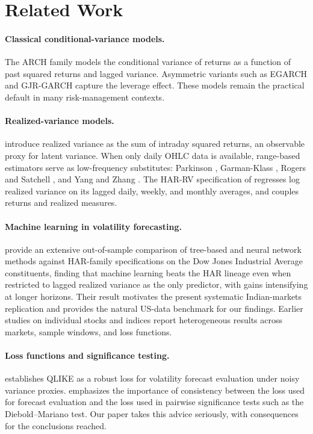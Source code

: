 \documentclass[11pt]{article}
\begin{document}
\section{Related Work}
\label{sec:related}

\paragraph{Classical conditional-variance models.} The ARCH family
\citep{engle1982arch, bollerslev1986garch} models the conditional
variance of returns as a function of past squared returns and lagged
variance. Asymmetric variants such as EGARCH \citep{nelson1991egarch}
and GJR-GARCH \citep{glosten1993relation} capture the leverage
effect. These models remain the practical default in many
risk-management contexts.

\paragraph{Realized-variance models.} \citet{andersen2003modeling}
introduce realized variance as the sum of intraday squared returns,
an observable proxy for latent variance. When only daily OHLC data
is available, range-based estimators serve as low-frequency
substitutes: Parkinson \citep{parkinson1980}, Garman-Klass
\citep{garman1980}, Rogers and Satchell \citep{rogers1991}, and Yang
and Zhang \citep{yang2000}. The HAR-RV specification of
\citet{corsi2009} regresses log realized variance on its lagged
daily, weekly, and monthly averages, and \citet{hansen2012realized}
couples returns and realized measures.

\paragraph{Machine learning in volatility forecasting.}
\citet{christensen2023machine} provide an extensive out-of-sample
comparison of tree-based and neural network methods against
HAR-family specifications on the Dow Jones Industrial Average
constituents, finding that machine learning beats the HAR lineage
even when restricted to lagged realized variance as the only
predictor, with gains intensifying at longer horizons. Their
result motivates the present systematic Indian-markets replication
and provides the natural US-data benchmark for our findings.
Earlier studies on individual stocks and indices report
heterogeneous results across markets, sample windows, and loss
functions.

\paragraph{Loss functions and significance testing.}
\citet{patton2011} establishes QLIKE as a robust loss for volatility
forecast evaluation under noisy variance proxies. \citet{patton2009volatility}
emphasizes the importance of consistency between the loss used for
forecast evaluation and the loss used in pairwise significance tests
such as the Diebold--Mariano test. Our paper takes this advice
seriously, with consequences for the conclusions reached.
\end{document}

